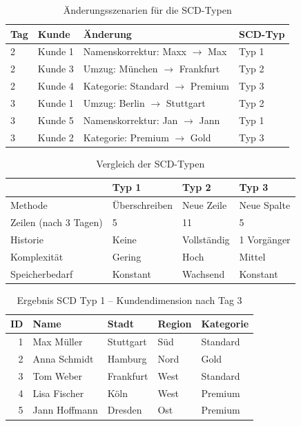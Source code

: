 \documentclass[a4paper,11pt]{article}
\begin{document}
\begin{table}[H]
\centering
\caption{Änderungsszenarien für die SCD-Typen}
\label{tab:aenderungen}
\begin{tabular}{llll}
\toprule
\textbf{Tag} & \textbf{Kunde} & \textbf{Änderung} & \textbf{SCD-Typ} \\
\midrule
2 & Kunde 1 & Namenskorrektur: Maxx $\rightarrow$ Max & Typ 1 \\
2 & Kunde 3 & Umzug: München $\rightarrow$ Frankfurt & Typ 2 \\
2 & Kunde 4 & Kategorie: Standard $\rightarrow$ Premium & Typ 3 \\
3 & Kunde 1 & Umzug: Berlin $\rightarrow$ Stuttgart & Typ 2 \\
3 & Kunde 5 & Namenskorrektur: Jan $\rightarrow$ Jann & Typ 1 \\
3 & Kunde 2 & Kategorie: Premium $\rightarrow$ Gold & Typ 3 \\
\bottomrule
\end{tabular}
\end{table}

\begin{table}[H]
\centering
\caption{Vergleich der SCD-Typen}
\label{tab:vergleich}
\begin{tabular}{llll}
\toprule
& \textbf{Typ 1} & \textbf{Typ 2} & \textbf{Typ 3} \\
\midrule
Methode & Überschreiben & Neue Zeile & Neue Spalte \\
Zeilen (nach 3 Tagen) & 5 & 11 & 5 \\
Historie & Keine & Vollständig & 1 Vorgänger \\
Komplexität & Gering & Hoch & Mittel \\
Speicherbedarf & Konstant & Wachsend & Konstant \\
\bottomrule
\end{tabular}
\end{table}

\begin{table}[H]
\centering
\caption{Ergebnis SCD Typ 1 -- Kundendimension nach Tag 3}
\label{tab:scd1_result}
\begin{tabular}{rllll}
\toprule
\textbf{ID} & \textbf{Name} & \textbf{Stadt} & \textbf{Region} & \textbf{Kategorie} \\
\midrule
1 & Max Müller & Stuttgart & Süd & Standard \\
2 & Anna Schmidt & Hamburg & Nord & Gold \\
3 & Tom Weber & Frankfurt & West & Standard \\
4 & Lisa Fischer & Köln & West & Premium \\
5 & Jann Hoffmann & Dresden & Ost & Premium \\
\bottomrule
\end{tabular}
\end{table}
\end{document}
